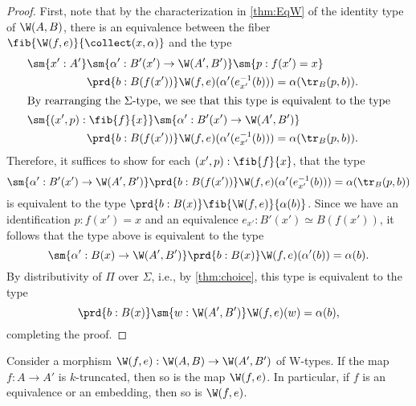 \begin{proof}
  First, note that by the characterization in \cref{thm:EqW} of the identity type of $\W(A,B)$, there is an equivalence between the fiber $\fib{\W(f,e)}{\collect(x,\alpha)}$ and the type
  \begin{align*}
    & \sm{x':A'}\sm{\alpha':B'(x')\to\W(A',B')}\sm{p:f(x')=x} \\*
    & \phantom{\sm{x':A'}}\prd{b:B(f(x'))}\W(f,e)(\alpha'(e_{x'}^{-1}(b)))=\alpha(\tr_{B}(p,b)). \\
    \intertext{By rearranging the $\Sigma$-type, we see that this type is equivalent to the type}
    & \sm{(x',p):\fib{f}{x}}\sm{\alpha':B'(x')\to\W(A',B')} \\*
    & \phantom{\sm{x':A'}}\prd{b:B(f(x'))}\W(f,e)(\alpha'(e_{x'}^{-1}(b)))=\alpha(\tr_{B}(p,b)).
  \end{align*}
  Therefore, it suffices to show for each $(x',p):\fib{f}{x}$, that the type
  \begin{equation*}
    \sm{\alpha':B'(x')\to\W(A',B')}\prd{b:B(f(x'))}\W(f,e)(\alpha'(e_{x'}^{-1}(b)))=\alpha(\tr_{B}(p,b))
  \end{equation*}
  is equivalent to the type $\prd{b:B(x)}\fib{\W(f,e)}{\alpha(b)}$. Since we have an identification $p:f(x')=x$ and an equivalence $e_{x'}:B'(x')\simeq B(f(x'))$, it follows that the type above is equivalent to the type
  \begin{equation*}
    \sm{\alpha':B(x)\to\W(A',B')}\prd{b:B(x)}\W(f,e)(\alpha'(b))=\alpha(b).
  \end{equation*}
  By distributivity of $\Pi$ over $\Sigma$, i.e., by \cref{thm:choice}, this type is equivalent to the type
  \begin{equation*}
    \prd{b:B(x)}\sm{w:\W(A',B')}\W(f,e)(w)=\alpha(b),
  \end{equation*}
  completing the proof.
\end{proof}

\begin{thm}
  Consider a morphism $\W(f,e):\W(A,B)\to\W(A',B')$ of W-types. If the map $f:A\to A'$ is $k$-truncated, then so is the map $\W(f,e)$. In particular, if $f$ is an equivalence or an embedding, then so is $\W(f,e)$.
\end{thm}

